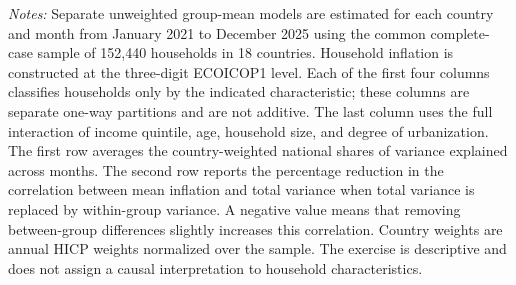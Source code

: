 \begin{table}[!htbp]
\small
\setlength{\tabcolsep}{4pt}
\caption{Household inflation variance and its association with mean inflation explained by observed characteristics}
\label{tab:household-inflation-explained-characteristics}
\centering
{}
\begin{flushleft}
\footnotesize{\emph{Notes:} Separate unweighted group-mean models are estimated for each country and month from January 2021 to December 2025 using the common complete-case sample of 152,440 households in 18 countries. Household inflation is constructed at the three-digit ECOICOP1 level. Each of the first four columns classifies households only by the indicated characteristic; these columns are separate one-way partitions and are not additive. The last column uses the full interaction of income quintile, age, household size, and degree of urbanization. The first row averages the country-weighted national shares of variance explained across months. The second row reports the percentage reduction in the correlation between mean inflation and total variance when total variance is replaced by within-group variance. A negative value means that removing between-group differences slightly increases this correlation. Country weights are annual HICP weights normalized over the sample. The exercise is descriptive and does not assign a causal interpretation to household characteristics.}
\end{flushleft}
\end{table}
